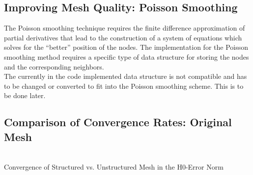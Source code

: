 \documentclass[a4paper,12pt]{article}
\makeatletter
\newenvironment{figurehere}
  {\def\@captype{figure}}
  {}
\makeatother
\begin{document}
\subsection{Improving Mesh Quality: Poisson Smoothing}\label{sec:poismoo}
The Poisson smoothing technique requires the finite difference approximation of partial derivatives that lead to the construction of a system of equations which solves for the ``better'' position of the nodes. The implementation for the Poisson smoothing method requires a specific type of data structure for storing the nodes and the corresponding neighbors. \\
The currently in the code implemented data structure is not compatible and has to be changed or converted to fit into the Poisson smoothing scheme. This is to be done later. 
\subsection{Comparison of Convergence Rates: Original Mesh}
\begin{center}
\begin{figurehere}
\\
\caption{Convergence of Structured vs. Unstructured Mesh in the H$0$-Error Norm}\label{fig:comparH0}
\end{figurehere}
\end{center}
\end{document}
